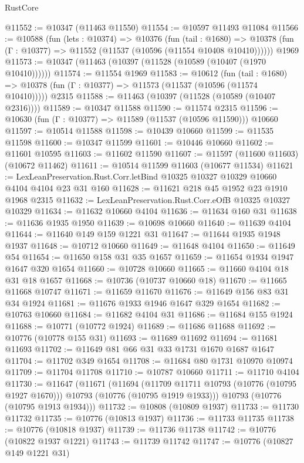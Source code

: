 \begin{lexlean}{RustCore}
\begin{coremodule}
@11552 := @10347 (@11463 @11550)
@11554 := @10597 @11493 @11084
@11566 := @10588
    (fun (lets : @10374) =>
    @10376
      (fun (tail : @1680) =>
      @10378 (fun (Γ : @10377) => @11552 (@11537 (@10596 (@11554 @10408 @10410))))))
    @1969
@11573 := @10347 (@11463 (@10397 (@11528 (@10589 (@10407 (@1970 @10410))))))
@11574 := @11554 @1969
@11583 := @10612
    (fun (tail : @1680) => @10378 (fun (Γ : @10377) => @11573 (@11537 (@10596 (@11574 @10410)))))
    @2315
@11588 := @11463 (@10397 (@11528 (@10589 (@10407 @2316))))
@11589 := @10347 @11588
@11590 := @11574 @2315
@11596 := @10630 (fun (Γ : @10377) => @11589 (@11537 (@10596 @11590))) @10660
@11597 := @10514 @11588
@11598 := @10439 @10660
@11599 := @11535 @11598
@11600 := @10347 @11599
@11601 := @10446 @10660
@11602 := @11601 @10595
@11603 := @11602 @11590
@11607 := @11597 (@11600 @11603) (@10672 @11462)
@11611 := @10514 @11599 @11603 (@10677 @11534)
@11621 := LexLeanPreservation.Rust.Corr.letBind @10325 @10327 @10329 @10660 @4104 @4104 @23 @31 @160
@11628 := @11621 @218 @45 @1952 @23 @1910 @1968 @2315
@11632 := LexLeanPreservation.Rust.Corr.eOfB @10325 @10327 @10329
@11634 := @11632 @10660 @4104
@11636 := @11634 @160 @31
@11638 := @11636 @1935 @1950
@11639 := @10698 @10660
@11640 := @11639 @4104
@11644 := @11640 @149 @159 @1221 @31
@11647 := @11644 @1935 @1948 @1937
@11648 := @10712 @10660
@11649 := @11648 @4104
@11650 := @11649 @54
@11654 := @11650 @158 @31 @35 @1657
@11659 := @11654 @1934 @1947 @1647 @320 @1654
@11660 := @10728 @10660
@11665 := @11660 @4104 @18 @31 @18 @1657
@11668 := @10736 (@10737 @10660 @18)
@11670 := @11665 @11668 @10747
@11671 := @11659 @11670
@11676 := @11649 @156 @83 @31 @34 @1924
@11681 := @11676 @1933 @1946 @1647 @329 @1654
@11682 := @10763 @10660
@11684 := @11682 @4104 @31
@11686 := @11684 @155 @1924
@11688 := @10771 (@10772 @1924)
@11689 := @11686 @11688
@11692 := @10776 (@10778 @155 @31)
@11693 := @11689 @11692
@11694 := @11681 @11693
@11702 := @11649 @81 @66 @31 @33 @1731 @1670 @1687 @1647
@11704 := @11702 @349 @1654
@11708 := @11684 @80 @1731 @10970 @10974
@11709 := @11704 @11708
@11710 := @10787 @10660
@11711 := @11710 @4104
@11730 := @11647
    (@11671
      (@11694
        (@11709 @11711 @10793 (@10776 (@10795 @1927 @1670)))
        @10793
        (@10776 (@10795 @1919 @1933)))
      @10793
      (@10776 (@10795 @1913 @1934)))
@11732 := @10808 (@10809 @1937)
@11733 := @11730 @11732
@11735 := @10776 (@10813 @1937)
@11736 := @11733 @11735
@11738 := @10776 (@10818 @1937)
@11739 := @11736 @11738
@11742 := @10776 (@10822 @1937 @1221)
@11743 := @11739 @11742
@11747 := @10776 (@10827 @149 @1221 @31)

\end{coremodule}
\end{lexlean}
